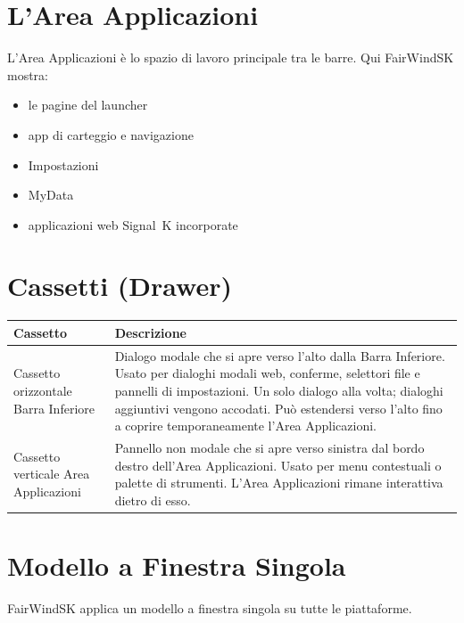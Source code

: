 
\section{L'Area Applicazioni}

L'Area Applicazioni è lo spazio di lavoro principale tra le barre. Qui FairWindSK mostra:

\begin{itemize}
  \item le pagine del launcher
  \item app di carteggio e navigazione
  \item Impostazioni
  \item MyData
  \item applicazioni web Signal~K incorporate
\end{itemize}

\section{Cassetti (Drawer)}

\begin{longtable}{L{4.0cm}L{9.7cm}}
\toprule
{}
\color{white}\sffamily\bfseries Cassetto &
\color{white}\sffamily\bfseries Descrizione \\
\midrule
Cassetto orizzontale Barra Inferiore &
  Dialogo modale che si apre verso l'alto dalla Barra Inferiore.
  Usato per dialoghi modali web, conferme, selettori file e pannelli di impostazioni.
  Un solo dialogo alla volta; dialoghi aggiuntivi vengono accodati.
  Può estendersi verso l'alto fino a coprire temporaneamente l'Area Applicazioni. \\
Cassetto verticale Area Applicazioni &
  Pannello non modale che si apre verso sinistra dal bordo destro dell'Area Applicazioni.
  Usato per menu contestuali o palette di strumenti.
  L'Area Applicazioni rimane interattiva dietro di esso. \\
\bottomrule
\end{longtable}

\section{Modello a Finestra Singola}

FairWindSK applica un modello a finestra singola su tutte le piattaforme.

